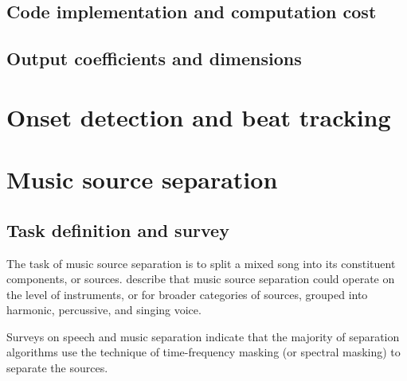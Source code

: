 \documentclass[letter,12pt,notitlepage]{article}
\begin{document}

\subsection{Code implementation and computation cost}


\subsection{Output coefficients and dimensions}


\vfill
\clearpage

\section{Onset detection and beat tracking}
\label{sec:beattrack}

\vfill
\clearpage

\section{Music source separation}
\label{sec:musicsep}

\subsection{Task definition and survey}

The task of music source separation is to split a mixed song into its constituent components, or sources. \citet{musicsepgood} describe that music source separation could operate on the level of instruments, or for broader categories of sources, grouped into harmonic, percussive, and singing voice.

Surveys on speech \cite{speechmask} and music separation \cite{musicmask} indicate that the majority of separation algorithms use the technique of time-frequency masking (or spectral masking) to separate the sources.
\end{document}
